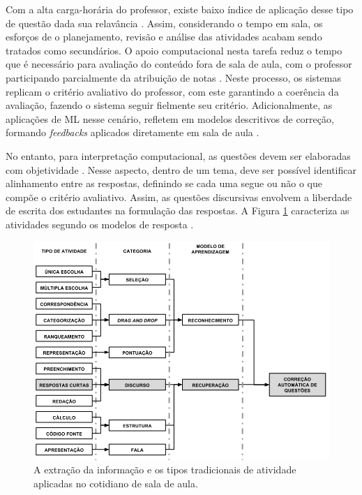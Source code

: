 Com a alta carga-horária do professor, existe baixo índice de aplicação desse tipo de questão dada sua relavância \cite{bilgin2017}. Assim, considerando o tempo em sala, os esforços de o planejamento, revisão e análise das atividades acabam sendo tratados como secundários. O apoio computacional nesta tarefa reduz o tempo que é necessário para avaliação do conteúdo fora de sala de aula, com o professor participando parcialmente da atribuição de notas \cite{ming2005}. Neste processo, os sistemas replicam o critério avaliativo do professor, com este garantindo a coerência da avaliação, fazendo o sistema seguir fielmente seu critério. Adicionalmente, as aplicações de ML nesse cenário, refletem em modelos descritivos de correção, formando \textit{feedbacks} aplicados diretamente em sala de aula \cite{butcher2010, bernius2022}. 

No entanto, para interpretação computacional, as questões devem ser elaboradas com objetividade \cite{bailey2008}. Nesse aspecto, dentro de um tema, deve ser possível identificar alinhamento entre as respostas, definindo se cada uma segue ou não o que compõe o critério avaliativo. Assim, as questões discursivas \cite{bezerra2008} envolvem a liberdade de escrita dos estudantes na formulação das respostas. A Figura \ref{fig-atividades} caracteriza as atividades segundo os modelos de resposta \cite{spalenza2017}.

\begin{figure}[!h]
\centering
\includegraphics[width=\textwidth]{figuras/tiposAtividade}
\caption{A extração da informação e os tipos tradicionais de atividade aplicadas no cotidiano de sala de aula.}
\label{fig-atividades}
\end{figure}

